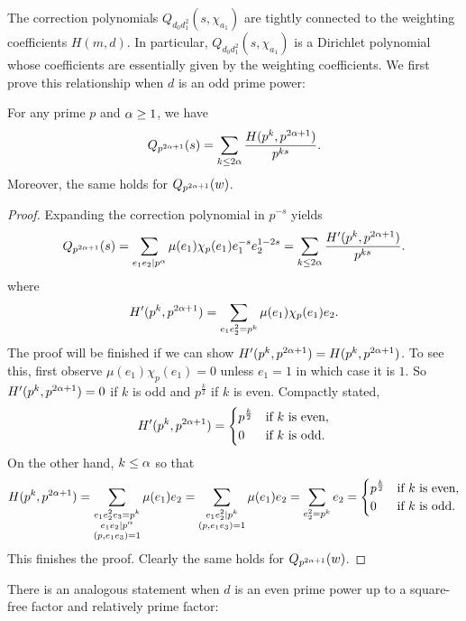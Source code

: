 \documentclass[12pt,reqno,oneside]{amsart}
\begin{document}
    The correction polynomials $Q_{d_{0}d_{1}^{2}}(s,\chi_{a_{1}})$ are tightly connected to the weighting coefficients $H(m,d)$. In particular, $Q_{d_{0}d_{1}^{2}}(s,\chi_{a_{1}})$ is a Dirichlet polynomial whose coefficients are essentially given by the weighting coefficients. We first prove this relationship when $d$ is an odd prime power:

    \begin{lemma}\label{lem:prime_correction_odd}
        For any prime $p$ and $\alpha \ge 1$, we have
        \[
            Q_{p^{2\alpha+1}}(s) = \sum_{k \le 2\alpha}\frac{H(p^{k},p^{2\alpha+1})}{p^{ks}}.
        \]
        Moreover, the same holds for $Q_{p^{2\alpha+1}}(w)$.
    \end{lemma}
    \begin{proof}
        Expanding the correction polynomial in $p^{-s}$ yields
        \[
            Q_{p^{2\alpha+1}}(s) = \sum_{e_{1}e_{2} \mid p^{\alpha}}\mu(e_{1})\chi_{p}(e_{1})e_{1}^{-s}e_{2}^{1-2s} = \sum_{k \le 2\alpha}\frac{H'(p^{k},p^{2\alpha+1})}{p^{ks}}.
        \]
        where
        \[
            H'(p^{k},p^{2\alpha+1}) = \sum_{e_{1}e_{2}^{2} = p^{k}}\mu(e_{1})\chi_{p}(e_{1})e_{2}.
        \]
        The proof will be finished if we can show $H'(p^{k},p^{2\alpha+1}) = H(p^{k},p^{2\alpha+1})$. To see this, first observe $\mu(e_{1})\chi_{p}(e_{1}) = 0$ unless $e_{1} = 1$ in which case it is $1$. So $H'(p^{k},p^{2\alpha+1}) = 0$ if $k$ is odd and $p^{\frac{k}{2}}$ if $k$ is even. Compactly stated,
        \[
            H'(p^{k},p^{2\alpha+1}) = \begin{cases} p^{\frac{k}{2}} & \text{if $k$ is even}, \\ 0 & \text{if $k$ is odd}. \end{cases}
        \]
        On the other hand, $k \le \alpha$ so that
        \[
            H(p^{k},p^{2\alpha+1}) = \sum_{\substack{e_{1}e_{2}^{2}e_{3} = p^{k} \\ e_{1}e_{2} \mid p^{\alpha} \\ (p,e_{1}e_{3}) = 1}}\mu(e_{1})e_{2} = \sum_{\substack{e_{1}e_{2}^{2} \mid p^{k} \\ (p,e_{1}e_{3}) = 1}}\mu(e_{1})e_{2} = \sum_{e_{2}^{2} = p^{k}}e_{2} =  \begin{cases} p^{\frac{k}{2}} & \text{if $k$ is even}, \\ 0 & \text{if $k$ is odd}. \end{cases}
        \]
        This finishes the proof. Clearly the same holds for $Q_{p^{2\alpha+1}}(w)$.
    \end{proof}

    There is an analogous statement when $d$ is an even prime power up to a square-free factor and relatively prime factor:
    
\end{document}
